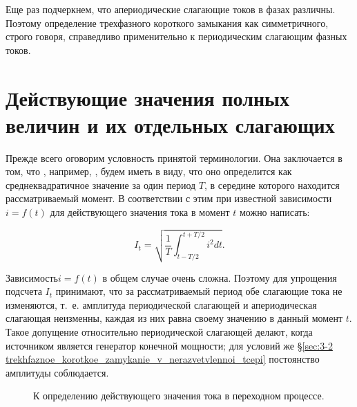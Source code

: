Еще раз подчеркнем, что апериодические слагающие токов в фазах различны. Поэтому определение трехфазного короткого замыкания как симметричного, строго говоря, справедливо применительно к периодическим слагающим фазных токов.

\section{Действующие значения полных величин и их отдельных слагающих}

Прежде всего оговорим условность принятой терминологии. Она заключается в том, что , например, , будем  иметь в виду, что оно  определится  как среднеквадратичное значение за один период $ T $, в середине которого находится рассматриваемый момент. В соответствии с этим при известной зависимости $ i = f(t) $ для  действующего значения тока в момент $ t $ можно написать:

\begin{equation}
	I_t = \sqrt{ \frac{1}{T} \int_{t-T/2}^{t+T/2} i^2 dt }.
	\label{eq:3-9 I_t}
\end{equation}

Зависимость$ i = f(t) $ в общем случае очень сложна. Поэтому для упрощения подсчета $ I_t $ принимают, что за рассматриваемый период обе слагающие тока не изменяются, т.~е. амплитуда периодической слагающей и апериодическая слагающая неизменны, каждая из них равна своему значению в данный момент $ t $. Такое допущение относительно периодической слагающей делают, когда источником является генератор конечной мощности; для условий же §\ref{sec:3-2 trekhfaznoe_korotkoe_zamykanie_v_nerazvetvlennoi_tcepi} постоянство амплитуды соблюдается.

\begin{figure}
	\caption{К определению действующего значения тока в переходном процессе.}
	\label{ris:3-5}
\end{figure}

